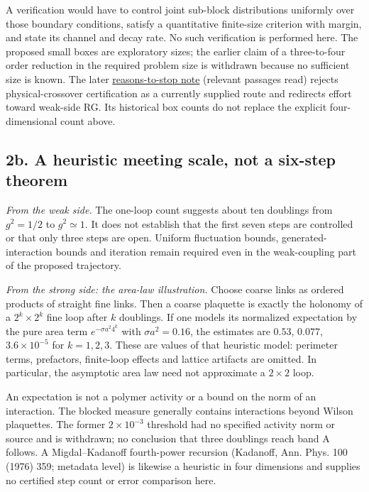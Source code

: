 \documentclass[11pt,a4paper]{article}
\begin{document}
A verification would have to control joint sub-block distributions
uniformly over those boundary conditions, satisfy a quantitative
finite-size criterion with margin, and state its channel and decay rate.
No such verification is performed here. The proposed small boxes are
exploratory sizes; the earlier claim of a three-to-four order reduction
in the required problem size is withdrawn because no sufficient size is
known. The later
\href{mass-gap-openings.md\#correlation-inequalities-and-the-transfer-they-require}{reasons-to-stop
note} (relevant passages read) rejects physical-crossover certification
as a currently supplied route and redirects effort toward weak-side RG.
Its historical box counts do not replace the explicit four-dimensional
count above.

\hypertarget{b.-a-heuristic-meeting-scale-not-a-six-step-theorem}{%
\subsection{2b. A heuristic meeting scale, not a six-step
theorem}\label{b.-a-heuristic-meeting-scale-not-a-six-step-theorem}}

\emph{From the weak side.} The one-loop count suggests about ten
doublings from \(g^2=1/2\) to \(g^2\simeq1\). It does not establish that
the first seven steps are controlled or that only three steps are open.
Uniform fluctuation bounds, generated-interaction bounds and iteration
remain required even in the weak-coupling part of the proposed
trajectory.

\emph{From the strong side: the area-law illustration.} Choose coarse
links as ordered products of straight fine links. Then a coarse
plaquette is exactly the holonomy of a \(2^k\times2^k\) fine loop after
\(k\) doublings. If one models its normalized expectation by the pure
area term \(e^{-\sigma a^2 4^k}\) with \(\sigma a^2=0.16\), the
estimates are \(0.53\), \(0.077\), \(3.6\times10^{-5}\) for \(k=1,2,3\).
These are values of that heuristic model: perimeter terms, prefactors,
finite-loop effects and lattice artifacts are omitted. In particular,
the asymptotic area law need not approximate a \(2\times2\) loop.

An expectation is not a polymer activity or a bound on the norm of an
interaction. The blocked measure generally contains interactions beyond
Wilson plaquettes. The former \(2\times10^{-3}\) threshold had no
specified activity norm or source and is withdrawn; no conclusion that
three doublings reach band A follows. A Migdal--Kadanoff fourth-power
recursion (Kadanoff, Ann. Phys. 100 (1976) 359; metadata level) is
likewise a heuristic in four dimensions and supplies no certified step
count or error comparison here.
\end{document}
